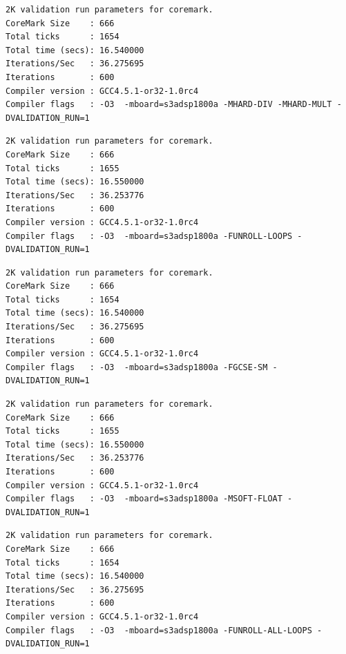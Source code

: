 \begin{lstlisting}[frame=single,caption={Optimización nivel -O3 - Flags activos -MHARD-DIV -MHARD-MULT},label={lst:salidas},breaklines]
2K validation run parameters for coremark.
CoreMark Size    : 666
Total ticks      : 1654
Total time (secs): 16.540000
Iterations/Sec   : 36.275695
Iterations       : 600
Compiler version : GCC4.5.1-or32-1.0rc4
Compiler flags   : -O3  -mboard=s3adsp1800a -MHARD-DIV -MHARD-MULT -DVALIDATION_RUN=1  
\end{lstlisting}

\begin{lstlisting}[frame=single,caption={Optimización nivel -O3 - Flags activos -FUNROLL-LOOPS},label={lst:salidas},breaklines]
2K validation run parameters for coremark.
CoreMark Size    : 666
Total ticks      : 1655
Total time (secs): 16.550000
Iterations/Sec   : 36.253776
Iterations       : 600
Compiler version : GCC4.5.1-or32-1.0rc4
Compiler flags   : -O3  -mboard=s3adsp1800a -FUNROLL-LOOPS -DVALIDATION_RUN=1  
\end{lstlisting}

\begin{lstlisting}[frame=single,caption={Optimización nivel -O3 - Flags activos -FGCSE-SM},label={lst:salidas},breaklines]
2K validation run parameters for coremark.
CoreMark Size    : 666
Total ticks      : 1654
Total time (secs): 16.540000
Iterations/Sec   : 36.275695
Iterations       : 600
Compiler version : GCC4.5.1-or32-1.0rc4
Compiler flags   : -O3  -mboard=s3adsp1800a -FGCSE-SM -DVALIDATION_RUN=1  
\end{lstlisting}

\begin{lstlisting}[frame=single,caption={Optimización nivel -O3 - Flags activos -MSOFT-FLOAT},label={lst:salidas},breaklines]
2K validation run parameters for coremark.
CoreMark Size    : 666
Total ticks      : 1655
Total time (secs): 16.550000
Iterations/Sec   : 36.253776
Iterations       : 600
Compiler version : GCC4.5.1-or32-1.0rc4
Compiler flags   : -O3  -mboard=s3adsp1800a -MSOFT-FLOAT -DVALIDATION_RUN=1  
\end{lstlisting}

\begin{lstlisting}[frame=single,caption={Optimización nivel -O3 - Flags activos -FUNROLL-ALL-LOOPS},label={lst:salidas},breaklines]
2K validation run parameters for coremark.
CoreMark Size    : 666
Total ticks      : 1654
Total time (secs): 16.540000
Iterations/Sec   : 36.275695
Iterations       : 600
Compiler version : GCC4.5.1-or32-1.0rc4
Compiler flags   : -O3  -mboard=s3adsp1800a -FUNROLL-ALL-LOOPS -DVALIDATION_RUN=1  
\end{lstlisting}

